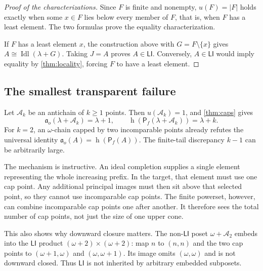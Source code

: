 \documentclass[11pt,letterpaper]{article}
\theoremstyle{teal}
\theoremstyle{definition}
\newcommand{\Pf}{\mathsf P_{\!f}}
\newcommand{\Idl}{\operatorname{Idl}}
\newcommand{\hgt}{\operatorname{h}}
\newcommand{\ao}{\mathfrak a_o}
\newcommand{\LI}{\mathsf{LI}}
\begin{document}
\begin{proof}[Proof of the characterizations]
Since $F$ is finite and nonempty, $u(F)=|F|$ holds exactly when some $x\in F$ lies below every member of $F$, that is, when $F$ has a least element. The two formulas prove the equality characterization.

If $F$ has a least element $x$, the construction above with $G=F\setminus\{x\}$ gives $A\cong\Idl(\lambda+G)$. Taking $J=A$ proves $A\in\LI$. Conversely, $A\in\LI$ would imply equality by \cref{thm:locality}, forcing $F$ to have a least element.
\end{proof}

\subsection{The smallest transparent failure}
Let $\mathcal A_k$ be an antichain of $k\geq1$ points. Then $u(\mathcal A_k)=1$, and \cref{thm:caps} gives
\begin{equation}\label{eq:fork}
 \ao(\lambda+\mathcal A_k)=\lambda+1,
 \qquad
 \hgt(\Pf(\lambda+\mathcal A_k))=\lambda+k.
\end{equation}
For $k=2$, an $\omega$-chain capped by two incomparable points already refutes the universal identity $\ao(A)=\hgt(\Pf(A))$. The finite-tail discrepancy $k-1$ can be arbitrarily large.

The mechanism is instructive. An ideal completion supplies a single element representing the whole increasing prefix. In the target, that element must use one cap point. Any additional principal images must then sit above that selected point, so they cannot use incomparable cap points. The finite powerset, however, can combine incomparable cap points one after another. It therefore sees the total number of cap points, not just the size of one upper cone.

This also shows why downward closure matters. The non-$\LI$ poset $\omega+\mathcal A_2$ embeds into the $\LI$ product $(\omega+2)\times(\omega+2)$: map $n$ to $(n,n)$ and the two cap points to $(\omega+1,\omega)$ and $(\omega,\omega+1)$. Its image omits $(\omega,\omega)$ and is not downward closed. Thus $\LI$ is not inherited by arbitrary embedded subposets.
\end{document}
